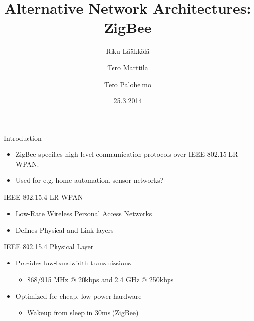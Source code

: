 \documentclass{beamer}
\title[ZigBee]{Alternative Network Architectures: ZigBee}
\author{Riku Lääkkölä \and Tero Marttila \and Tero Paloheimo}
\institute{Aalto ELEC}
\date{25.3.2014}
\begin{document}
\begin{frame}
  	\titlepage
\end{frame}


\begin{frame}{Introduction}
  \begin{itemize}
    \item ZigBee specifies high-level communication protocols over IEEE 802.15 LR-WPAN.
    \item Used for e.g. home automation, sensor networks?
  \end{itemize}
\end{frame}

\begin{frame}{IEEE 802.15.4 LR-WPAN}
  \begin{itemize}
  	\item Low-Rate Wireless Personal Access Networks
	\item Defines Physical and Link layers
  	
  \end{itemize}
\end{frame}

\begin{frame}{IEEE 802.15.4 Physical Layer}
  \begin{itemize}
  	\item Provides low-bandwidth transmissions
  	\begin{itemize}
  		\item 868/915 MHz @ 20kbps and 2.4 GHz @ 250kbps
  	\end{itemize}
  	\item Optimized for cheap, low-power hardware
  	\begin{itemize}
    	\item Wakeup from sleep in 30ms (ZigBee)
  	\end{itemize}
  \end{itemize}
\end{frame}
    
\end{document}

